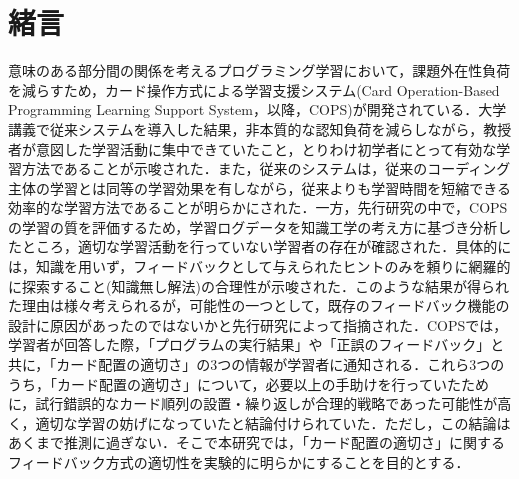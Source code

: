 \section{緒言}

意味のある部分間の関係を考えるプログラミング学習において，課題外在性負荷を減らすため，カード操作方式による学習支援システム(Card Operation-Based Programming Learning Support System，以降，COPS)が開発されている\cite{matsumoto2018}．大学講義で従来システムを導入した結果，非本質的な認知負荷を減らしながら，教授者が意図した学習活動に集中できていたこと，とりわけ初学者にとって有効な学習方法であることが示唆された．また，従来のシステムは，従来のコーディング主体の学習とは同等の学習効果を有しながら，従来よりも学習時間を短縮できる効率的な学習方法であることが明らかにされた．一方，先行研究の中で，COPSの学習の質を評価するため，学習ログデータを知識工学の考え方に基づき分析したところ，適切な学習活動を行っていない学習者の存在が確認された．具体的には，知識を用いず，フィードバックとして与えられたヒントのみを頼りに網羅的に探索すること(知識無し解法)の合理性が示唆された．このような結果が得られた理由は様々考えられるが，可能性の一つとして，既存のフィードバック機能の設計に原因があったのではないかと先行研究によって指摘された．COPSでは，学習者が回答した際，「プログラムの実行結果」や「正誤のフィードバック」と共に，「カード配置の適切さ」の3つの情報が学習者に通知される．これら3つのうち，「カード配置の適切さ」について，必要以上の手助けを行っていたために，試行錯誤的なカード順列の設置・繰り返しが合理的戦略であった可能性が高く，適切な学習の妨げになっていたと結論付けられていた．ただし，この結論はあくまで推測に過ぎない．そこで本研究では，「カード配置の適切さ」に関するフィードバック方式の適切性を実験的に明らかにすることを目的とする．